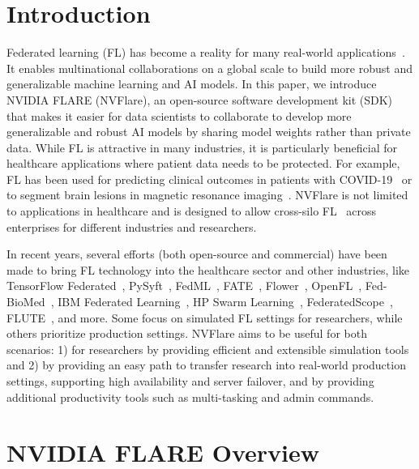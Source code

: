 \documentclass[11pt]{article}
\begin{document}
\section{Introduction}
Federated learning (FL) has become a reality for many real-world applications~\cite{Holger-rieke2020future}. It enables multinational collaborations on a global scale to build more robust and generalizable machine learning and AI models.
%
In this paper, we introduce NVIDIA FLARE (NVFlare), an open-source software development kit (SDK) that makes it easier for data scientists to collaborate to develop more generalizable and robust AI models by sharing model weights rather than private data.
%
While FL is attractive in many industries, it is particularly beneficial for healthcare applications where patient data needs to be protected. For example, FL has been used for predicting clinical outcomes in patients with COVID-19~\cite{Holger-dayan2021federated} or to segment brain lesions in magnetic resonance imaging~\cite{Holger-sheller2018multi,Holger-sheller2020federated}. NVFlare is not limited to applications in healthcare and is designed to allow cross-silo FL~\cite{Holger-kairouz2019advances} across enterprises for different industries and researchers.

In recent years, several efforts (both open-source and commercial) have been made to bring FL technology into the healthcare sector and other industries, like TensorFlow Federated~\cite{Holger-abadi2016tensorflow}, PySyft~\cite{Holger-ziller2021pysyft}, FedML~\cite{Holger-he2020fedml}, FATE~\cite{Holger-liu2021fate}, Flower~\cite{Holger-beutel2020flower}, OpenFL~\cite{Holger-reina2021openfl}, Fed-BioMed~\cite{Holger-silva2020fed}, IBM Federated Learning~\cite{Holger-ludwig2020ibm}, HP Swarm Learning~\cite{Holger-warnat2021swarm}, FederatedScope~\cite{Holger-xie2022federatedscope}, FLUTE~\cite{Holger-dimitriadis2022flute}, and more. Some focus on simulated FL settings for researchers, while others prioritize production settings. NVFlare aims to be useful for both scenarios: 1) for researchers by providing efficient and extensible simulation tools and 2) by providing an easy path to transfer research into real-world production settings, supporting high availability and server failover, and by providing additional productivity tools such as multi-tasking and admin commands.

\section{NVIDIA FLARE Overview}
\end{document}
